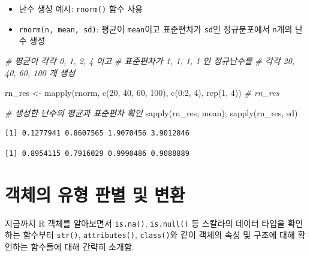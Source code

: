 \documentclass[
  11pt,
]{krantz}
\newenvironment{Shaded}{\begin{snugshade}}{\end{snugshade}}
\newcommand{\CommentTok}[1]{\textcolor[rgb]{0.37,0.37,0.37}{\textit{#1}}}
\newcommand{\DecValTok}[1]{\textcolor[rgb]{0.06,0.06,0.06}{#1}}
\newcommand{\FunctionTok}[1]{\textcolor[rgb]{0,0,0}{#1}}
\newcommand{\NormalTok}[1]{#1}
\newcommand{\OtherTok}[1]{\textcolor[rgb]{0.37,0.37,0.37}{#1}}
\newcommand{\SpecialCharTok}[1]{\textcolor[rgb]{0,0,0}{#1}}
\providecommand{\tightlist}{%
  \setlength{\itemsep}{0pt}\setlength{\parskip}{0pt}}
\begin{document}
\normalsize

\begin{itemize}
\tightlist
\item
  난수 생성 예시: \texttt{rnorm()} 함수 사용
\item
  \texttt{rnorm(n,\ mean,\ sd)}: 평균이 \texttt{mean}이고 표준편차가 \texttt{sd}인 정규분포에서 \texttt{n}개의 난수 생성
\end{itemize}

\footnotesize

\begin{Shaded}
\begin{Highlighting}[]
\CommentTok{\# 평균이 각각 0, 1, 2, 4 이고}
\CommentTok{\# 표준편차가 1, 1, 1, 1 인 정규난수를 }
\CommentTok{\# 각각 20, 40, 60, 100 개 생성}

\NormalTok{rn\_res }\OtherTok{\textless{}{-}} \FunctionTok{mapply}\NormalTok{(rnorm, }
                 \FunctionTok{c}\NormalTok{(}\DecValTok{20}\NormalTok{, }\DecValTok{40}\NormalTok{, }\DecValTok{60}\NormalTok{, }\DecValTok{100}\NormalTok{), }
                 \FunctionTok{c}\NormalTok{(}\DecValTok{0}\SpecialCharTok{:}\DecValTok{2}\NormalTok{, }\DecValTok{4}\NormalTok{), }
                 \FunctionTok{rep}\NormalTok{(}\DecValTok{1}\NormalTok{, }\DecValTok{4}\NormalTok{))}
\CommentTok{\# rn\_res}

\CommentTok{\# 생성한 난수의 평균과 표준편차 확인}
\FunctionTok{sapply}\NormalTok{(rn\_res, mean); }\FunctionTok{sapply}\NormalTok{(rn\_res, sd)}
\end{Highlighting}
\end{Shaded}

\begin{verbatim}
[1] 0.1277941 0.8607565 1.9070456 3.9012846
\end{verbatim}

\begin{verbatim}
[1] 0.8954115 0.7916029 0.9990486 0.9088889
\end{verbatim}

\normalsize

\hypertarget{is-as-function}{%
\section{객체의 유형 판별 및 변환}\label{is-as-function}}

지금까지 R 객체를 알아보면서 \texttt{is.na()}, \texttt{is.null()} 등 스칼라의 데이터 타입을 확인하는 함수부터
\texttt{str()}, \texttt{attributes()}, \texttt{class()}와 같이 객체의 속성 및 구조에 대해 확인하는 함수들에 대해 간략히 소개함.
\end{document}
